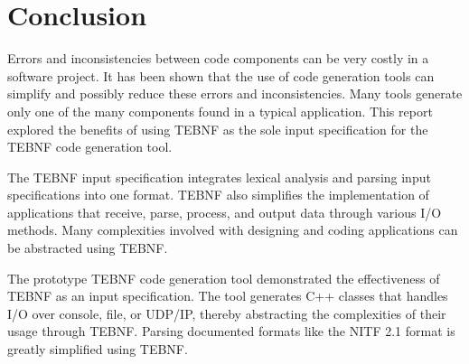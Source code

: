 \chapter{Conclusion}
Errors and inconsistencies between code components can be very costly in a software project.  It has been shown that the use of code generation tools can simplify and possibly reduce these errors and inconsistencies.  Many tools generate only one of the many components found in a typical application.  This report explored the benefits of using TEBNF as the sole input specification for the TEBNF code generation tool.

\indent
The TEBNF input specification integrates lexical analysis and parsing input specifications into one format.  TEBNF also simplifies the implementation of applications that receive, parse, process, and output data through various I/O methods.  Many complexities involved with designing and coding applications can be abstracted using TEBNF.

\indent
The prototype TEBNF code generation tool demonstrated the effectiveness of TEBNF as an input specification.  The tool generates C++ classes that handles I/O over console, file, or UDP/IP, thereby abstracting the complexities of their usage through TEBNF.  Parsing documented formats like the NITF 2.1 format is greatly simplified using TEBNF. 
